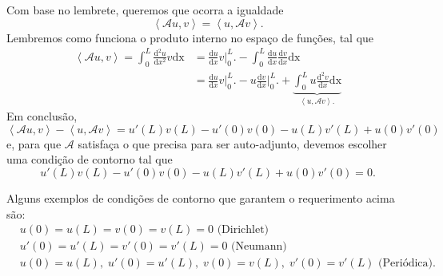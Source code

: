 \documentclass[../pde_notes.tex]{subfiles}
\begin{document}
Com base no lembrete, queremos que ocorra a igualdade
\[
	\left< \mathcal{A}u, v \right> = \left< u,\mathcal{A}v\right>.
\]
Lembremos como funciona o produto interno no espaço de funções, tal que
\begin{align*}
	\left< \mathcal{A}u, v \right> = \int_{0}^{L}\frac{\mathrm{d}^{2}u}{\mathrm{d}x^{2}}v \mathrm{dx} & = \frac{\mathrm{d}u}{\mathrm{d}x}v \biggl|_{0}^{L}\biggr. - \int_{0}^{L}\frac{\mathrm{d}u}{\mathrm{d}x}\frac{\mathrm{d}v}{\mathrm{d}x} \mathrm{dx}                                                                                 \\
	                                                                                                  & = \frac{\mathrm{d}u}{\mathrm{d}x}v \biggl|_{0}^{L}\biggr. - u \frac{\mathrm{d}v}{\mathrm{d}x}\biggl|_{0}^{L}\biggr. + \underbrace{\int_{0}^{L}u \frac{\mathrm{d}^{2}v}{\mathrm{d}x} \mathrm{dx}}_{\left< u, \mathcal{A}v \right>.}
\end{align*}
Em conclusão,
\[
	\left< \mathcal{A}u, v \right> - \left< u, \mathcal{A}v \right> = u'(L)v(L) - u'(0)v(0) - u(L)v'(L) + u(0)v'(0)
\]
e, para que \(\mathcal{A}\) satisfaça o que precisa para ser auto-adjunto, devemos escolher uma condição de contorno tal que
\[
	u'(L)v(L) - u'(0)v(0) - u(L)v'(L) + u(0)v'(0)=0.
\]
\begin{example}
	Alguns exemplos de condições de contorno que garantem o requerimento acima são:
	\begin{align*}
		 & u(0) = u(L) = v(0) = v(L) = 0 \text{ (Dirichlet)}                                  \\
		 & u'(0) = u'(L) = v'(0) = v'(L) = 0 \text{ (Neumann)}                                \\
		 & u(0) = u(L),\; u'(0) = u'(L), \; v(0) = v(L),\; v'(0) = v'(L) \text{ (Periódica)}.
	\end{align*}
\end{example}
\end{document}
